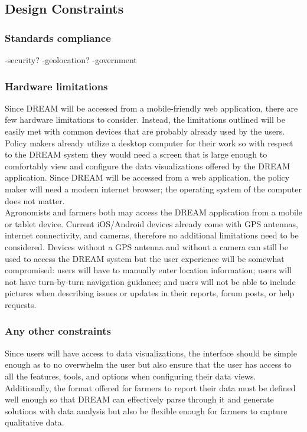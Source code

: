 \subsection{Design Constraints}


\subsubsection{Standards compliance}\label{standards}
-security?
-geolocation?
-government
\subsubsection{Hardware limitations}

Since DREAM will be accessed from a mobile-friendly web application, there are few hardware limitations to consider. Instead, the limitations outlined will be easily met with common devices that are probably already used by the users.\smallskip\\
Policy makers already utilize a desktop computer for their work so with respect to the DREAM system they would need a screen that is large enough to comfortably view and configure the data visualizations offered by the DREAM application. Since DREAM will be accessed from a web application, the policy maker will need a modern internet browser; the operating system of the computer does not matter.\smallskip\\
Agronomists and farmers both may access the DREAM application from a mobile or tablet device. Current iOS/Android devices already come with GPS antennas, internet connectivity, and cameras, therefore no additional limitations need to be considered. Devices without a GPS antenna and without a camera can still be used to access the DREAM system but the user experience will be somewhat compromised: users will have to manually enter location information; users will not have turn-by-turn navigation guidance; and users will not be able to include pictures when describing issues or updates in their reports, forum posts, or help requests.\\

\subsubsection{Any other constraints}
\begin{flushleft}
Since users will have access to data visualizations, the interface should be simple enough as to no overwhelm the user but also ensure that the user has access to all the features, tools, and options when configuring their data views. Additionally, the format offered for farmers to report their data must be defined well enough so that DREAM can effectively parse through it and generate solutions with data analysis but also be flexible enough for farmers to capture qualitative data.
\end{flushleft}

